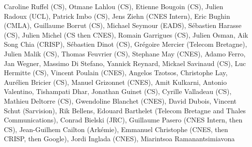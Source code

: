 Caroline Ruffel (CS), Otmane Lahlou (CS), Etienne Bougoin (CS), Julien Radoux (UCL), Patrick Imbo (CS), Jens Ziehn (CNES Intern), Eric Bughin (CMLA), Guillaume Borrut (CS), Michael Seymour (EADS), S\'ebastien Harasse (CS), Julien Michel (CS then CNES), Romain Garrigues (CS), Julien Osman, Aik Song Chia (CRISP), S\'ebastien Dinot (CS), Gr\'egoire Mercier (Telecom Bretagne), Julien Malik (CS), Thomas Feuvrier (CS), Stephane May (CNES), Adamo Ferro, Jan Wegner, Massimo Di Stefano, Yannick Reynard, Mickael Savinaud (CS), Luc Hermitte (CS), Vincent Poulain (CNES), Angelos Tzotsos, Christophe Lay, Aur\'elien Bricier (CS), Manuel Grizonnet (CNES), Amit Kulkarni, Antonio Valentino, Tishampati Dhar, Jonathan Guinet (CS), Cyrille Valladeau (CS), Mathieu Deltorre (CS), Gwendoline Blanchet (CNES), David Dubois, Vincent Schut (Sarvision), Rik Bellens, Edouard Barthelet (Telecom Bretagne and Thales Communications), Conrad Bielski (JRC), Guillaume Pasero (CNES Intern, then CS), Jean-Guilhem Cailton (Ark\'emie), Emmanuel Christophe (CNES, then CRISP, then Google), Jordi Inglada (CNES), Miarintsoa Ramanantsimiavona